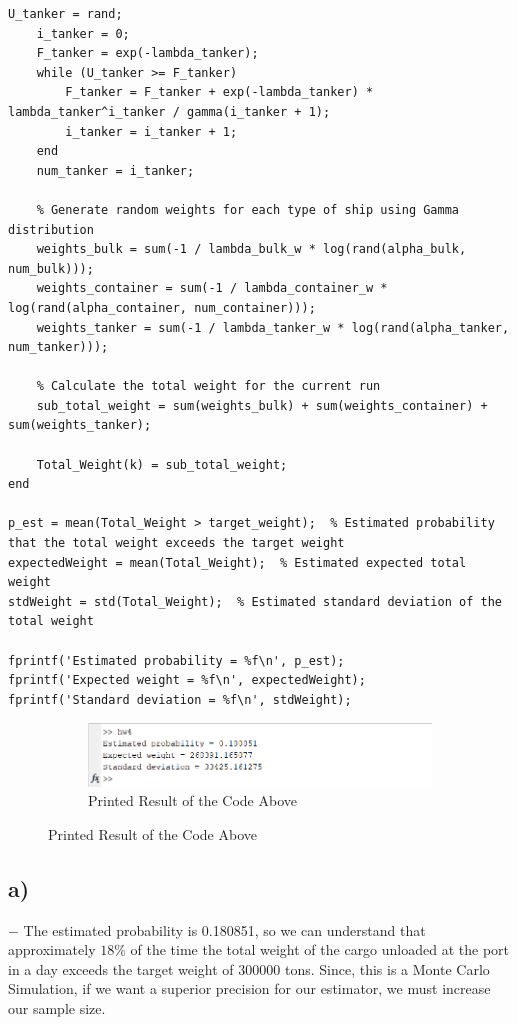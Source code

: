 \documentclass[12pt]{article}
\begin{document}
\begin{lstlisting}[style=Matlab-editor]
    U_tanker = rand;
    i_tanker = 0;
    F_tanker = exp(-lambda_tanker);
    while (U_tanker >= F_tanker)
        F_tanker = F_tanker + exp(-lambda_tanker) * lambda_tanker^i_tanker / gamma(i_tanker + 1);
        i_tanker = i_tanker + 1;
    end
    num_tanker = i_tanker;
    
    % Generate random weights for each type of ship using Gamma distribution
    weights_bulk = sum(-1 / lambda_bulk_w * log(rand(alpha_bulk, num_bulk)));
    weights_container = sum(-1 / lambda_container_w * log(rand(alpha_container, num_container)));
    weights_tanker = sum(-1 / lambda_tanker_w * log(rand(alpha_tanker, num_tanker)));
    
    % Calculate the total weight for the current run
    sub_total_weight = sum(weights_bulk) + sum(weights_container) + sum(weights_tanker);
    
    Total_Weight(k) = sub_total_weight;
end

p_est = mean(Total_Weight > target_weight);  % Estimated probability that the total weight exceeds the target weight
expectedWeight = mean(Total_Weight);  % Estimated expected total weight
stdWeight = std(Total_Weight);  % Estimated standard deviation of the total weight

fprintf('Estimated probability = %f\n', p_est);
fprintf('Expected weight = %f\n', expectedWeight);
fprintf('Standard deviation = %f\n', stdWeight);

\end{lstlisting}


\begin{figure}[H]
  \centering
  \begin{subfigure}[b]{0.4\linewidth}
    \includegraphics[width=\linewidth]{Screenshot (2317).png}
    \caption*{Printed Result of the Code Above}
  \end{subfigure}
\end{figure}


\subsection*{a)} 
$-$ The estimated probability is 0.180851, so we can understand that approximately $18\%$ of the time  the total weight of the cargo unloaded at the port in a day exceeds the target weight of 300000 tons. Since, this is a Monte Carlo Simulation, if we want a superior precision for our estimator, we must increase our sample size.\\
\end{document}
